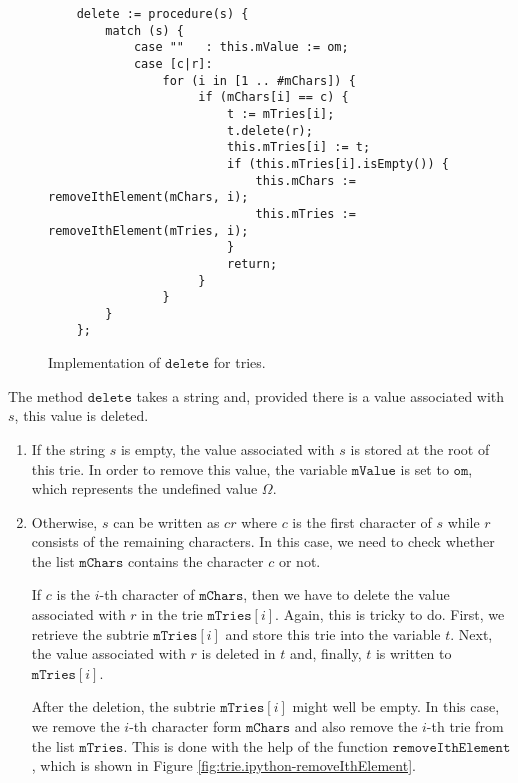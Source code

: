 \begin{figure}[!ht]
\centering
\begin{verbatim}
    delete := procedure(s) {
        match (s) {
            case ""   : this.mValue := om;
            case [c|r]: 
                for (i in [1 .. #mChars]) {
                     if (mChars[i] == c) {
                         t := mTries[i]; 
                         t.delete(r);
                         this.mTries[i] := t;
                         if (this.mTries[i].isEmpty()) {
                             this.mChars := removeIthElement(mChars, i);
                             this.mTries := removeIthElement(mTries, i);
                         }
                         return;
                     }
                }
        }
    };
\end{verbatim}
\vspace*{-0.3cm}
\caption{Implementation of $\texttt{delete}$ for tries.}
\label{fig:trie.ipython-delete}
\end{figure}

The method $\texttt{delete}$ takes a string and, provided there is a value associated with $s$, this
value is deleted.
\begin{enumerate}
\item If the string $s$ is empty, the value associated with $s$ is stored at the root of this trie.
      In order to remove this value, the variable $\texttt{mValue}$ is set to $\texttt{om}$, which represents
      the undefined value $\Omega$.
\item Otherwise, $s$ can be written as $cr$ where $c$ is the first character of $s$ while $r$
      consists of the remaining characters.  In this case, we need to check whether the list
      $\texttt{mChars}$ contains the character $c$ or not.
 
      If $c$ is the $i$-th character of $\texttt{mChars}$, then we have to delete the value 
      associated with $r$ in the trie $\texttt{mTries}[i]$.  Again, this is tricky to do.
      First, we retrieve the subtrie $\texttt{mTries}[i]$ and store this trie into the
      variable $t$.  Next, the value associated with $r$ is deleted in $t$ and, finally, 
      $t$ is written to $\texttt{mTries}[i]$.  

      After the deletion, the subtrie  $\texttt{mTries}[i]$ might well be empty.  In this case,
      we remove the $i$-th character form $\texttt{mChars}$ and also remove the $i$-th trie from the list
      $\texttt{mTries}$.  This is done with the help of the function $\texttt{removeIthElement}$,
      which is shown in Figure \ref{fig:trie.ipython-removeIthElement}.
\end{enumerate}

